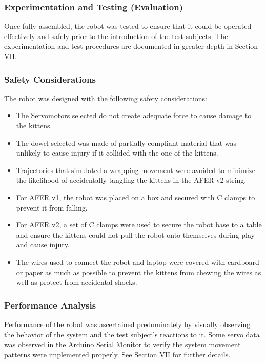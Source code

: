 \subsubsection{ Experimentation and Testing (Evaluation) }
Once fully assembled, the robot was tested to ensure that it could be operated effectively and safely prior to the introduction of the test subjects. The experimentation and test procedures are documented in greater depth in Section VII.

\subsubsection{Safety Considerations}
The robot was designed with the following safety considerations: 
\begin{itemize}
\item The Servomotors selected do not create adequate force to cause damage to the kittens.
\item The dowel selected was made of partially compliant material that was unlikely to cause injury if it collided with the one of the kittens.
\item Trajectories that simulated a wrapping movement were avoided to minimize the likelihood of accidentally tangling the kittens in the AFER v2 string.
\item For AFER v1, the robot was placed on a box and secured with C clamps to prevent it from falling.
\item For AFER v2, a set of C clamps were used to secure the robot base to a table and ensure the kittens could not pull the robot onto themselves during play and cause injury.
\item The wires used to connect the robot and laptop were covered with cardboard or paper as much as possible to prevent the kittens from chewing the wires as well as protect from accidental shocks.
\end{itemize}

\subsubsection{Performance Analysis}
Performance of the robot was ascertained predominately by visually observing the behavior of the system and the test subject’s reactions to it. Some servo data was observed in the Arduino Serial Monitor to verify the system movement patterns were implemented properly. See Section VII for further details.

